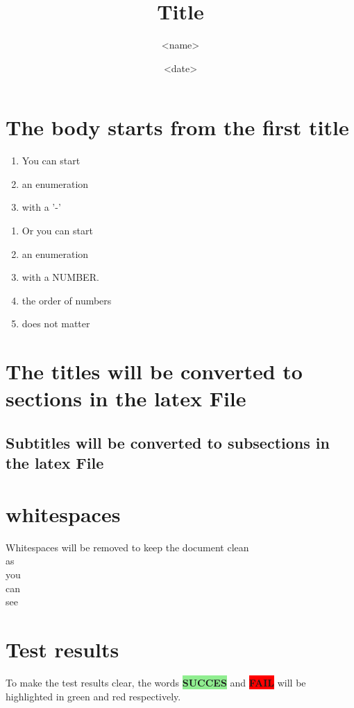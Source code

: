 \documentclass{article}
\begin{document}
\title{Title}
\author{<name>}
\date{<date>}
\maketitle
\newpage

\section{The body starts from the first title}
\begin{enumerate}\item You can start \item an enumeration\item with a '-'\end{enumerate}
\begin{enumerate}\item Or you can start\item an enumeration\item with a NUMBER.\item the order of numbers\item does not matter\end{enumerate}
\section{The titles will be converted to sections in the latex File}
\subsection{Subtitles will be converted to subsections in the latex File}
\section{whitespaces }
Whitespaces will be removed to keep the document clean\\
as \\
you\\
can\\
see\\
\section{Test results}
To make the test results clear, the words \colorbox{lightgreen}{\textbf{SUCCES}} and \colorbox{red}{\textbf{FAIL}} will be highlighted in green and red respectively.\\
\end{document}
